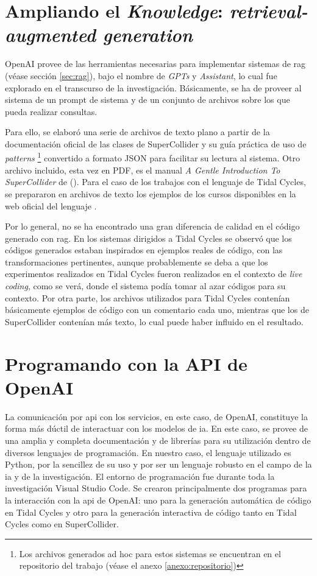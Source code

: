 \section{Ampliando el \emph{Knowledge}: \emph{retrieval-augmented generation}}

OpenAI provee de las herramientas necesarias para implementar sistemas de \gls{rag} (véase sección \ref{sec:rag}), bajo el nombre de \emph{GPTs} y \emph{Assistant}, lo cual fue explorado en el transcurso de la investigación. Básicamente, se ha de proveer al sistema de un prompt de sistema y de un conjunto de archivos sobre los que pueda realizar consultas. 

Para ello, se elaboró una serie de archivos de texto plano a partir de la documentación oficial de las clases de SuperCollider y su guía práctica de uso de \emph{patterns} \citep{SuperCollider12Help}\footnote{Los archivos generados ad hoc para estos sistemas se encuentran en el repositorio del trabajo (véase el anexo \ref{anexo:repositorio})} convertido a formato JSON para facilitar su lectura al sistema. Otro archivo incluido, esta vez en PDF, es el manual \emph{A Gentle Introduction To SuperCollider} de \citeauthor{ruviaroGentleIntroductionSuperCollider2015} (\citeyear{ruviaroGentleIntroductionSuperCollider2015}). Para el caso de los trabajos con el lenguaje de Tidal Cycles, se prepararon en archivos de texto los ejemplos de los cursos disponibles en la web oficial del lenguaje \citep{TidalCycles}.

Por lo general, no se ha encontrado una gran diferencia de calidad en el código generado con \gls{rag}. En los sistemas dirigidos a Tidal Cycles se observó que los códigos generados estaban inspirados en ejemplos reales de código, con las transformaciones pertinentes, aunque probablemente se deba a que los experimentos realizados en Tidal Cycles fueron realizados en el contexto de \emph{live coding}, como se verá, donde el sistema podía tomar al azar códigos para su contexto. Por otra parte, los archivos utilizados para Tidal Cycles contenían básicamente ejemplos de código con un comentario cada uno, mientras que los de SuperCollider contenían más texto, lo cual puede haber influido en el resultado.


\section{Programando con la API de OpenAI}

La comunicación por \gls{api} con los servicios, en este caso, de OpenAI, constituye la forma más dúctil de interactuar con los modelos de \gls{ia}. En este caso, se provee de una amplia y completa documentación y de librerías para su utilización dentro de diversos lenguajes de programación. En nuestro caso, el lenguaje utilizado es Python, por la sencillez de su uso y por ser un lenguaje robusto en el campo de la \gls{ia} y de la investigación. El entorno de programación fue durante toda la investigación Visual Studio Code. Se crearon principalmente dos programas para la interacción con la \gls{api} de OpenAI: uno para la generación automática de código en Tidal Cycles y otro para la generación interactiva de código tanto en Tidal Cycles como en SuperCollider.

